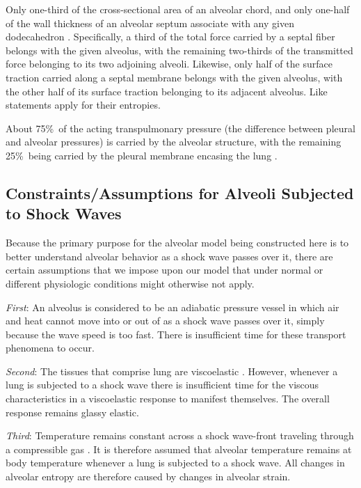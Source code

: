 Only one-third of the cross-sectional area of an alveolar chord, and only one-half of the wall thickness of an alveolar septum associate with any given dodecahedron \cite{Kimmeletal87}.  Specifically, a third of the total force carried by a septal fiber belongs with the  given alveolus, with the remaining two-thirds of the transmitted force belonging to its two adjoining alveoli.  Likewise, only half of the surface traction carried along a septal membrane belongs with the given alveolus, with the other half of its surface traction belonging to its adjacent alveolus.  Like statements apply for their entropies.

About 75\%\ of the acting transpulmonary pressure (the difference between pleural and alveolar pressures) is carried by the alveolar structure, with the remaining 25\%\ being carried by the pleural membrane encasing the lung \cite{Hajjietal79}.

\subsection{Constraints\slash Assumptions for Alveoli Subjected to Shock Waves}

Because the primary purpose for the alveolar model being constructed here is to better understand alveolar behavior as a shock wave passes over it, there are certain assumptions that we impose upon our model that under normal or different physiologic conditions might otherwise not apply.  

\textit{First\/}: An alveolus is considered to be an adiabatic pressure vessel in which air and heat cannot move into or out of as a shock wave passes over it, simply because the wave speed is too fast.  There is insufficient time for these transport phenomena to occur.

\textit{Second\/}: The tissues that comprise lung are visco\-elastic \cite{Hildebrandt69,HoppinHildebrandt77}.  However, whenever a lung is subjected to a shock wave there is insufficient time for the viscous characteristics in a visco\-elastic response to manifest themselves.  The overall response remains glassy elastic.

\textit{Third\/}: Temperature remains constant across a shock wave-front traveling through a compressible gas \cite{AmesStaff53}.  It is therefore assumed that alveolar temperature remains at body temperature whenever a lung is subjected to a shock wave.  All changes in alveolar entropy are therefore caused by changes in alveolar strain.


